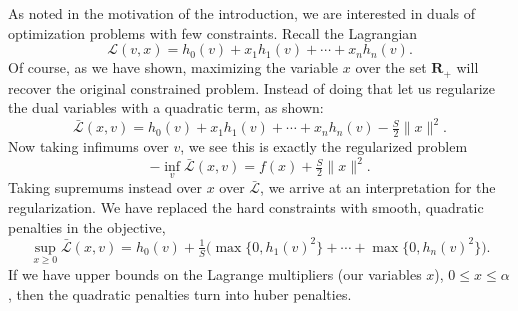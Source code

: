 \begin{example} As noted in the motivation of the introduction, we are interested
in duals of optimization problems with few constraints. Recall the Lagrangian
\[
\mathcal{L}(v,x) = h_0(v) + x_1h_1(v) + \cdots + x_nh_n(v).
\]
Of course, as we have shown, maximizing the variable $x$ over the set $\mathbf{R}_{+}$ will recover
the original constrained problem. Instead of doing that let us regularize
the dual variables with a quadratic term, as shown:
\[
\bar{\mathcal{L}}(x,v)=h_0(v)+x_1h_1(v) + \cdots + x_nh_n(v) - \tfrac{S}{2}\|x\|^2.
\]
Now taking infimums over $v$, we see this is exactly the regularized problem
\[
-\inf_v\bar{\mathcal{L}}(x,v) = f(x) + \tfrac{S}{2}\|x\|^2.
\]
Taking supremums instead over $x$ over $\mathcal{\bar{L}}$, we arrive at an
interpretation for the regularization. We have replaced the hard constraints
with smooth,  quadratic penalties in the objective,
\[
\sup_{x\geq0}\bar{\mathcal{L}}(x,v)=h_0(v)+ \tfrac{1}{S}\big(\max\{0,h_1 (v)^2\} + \cdots + \max\{0,h_n (v)^2\}\big).
\]
If we have upper bounds on the Lagrange multipliers (our variables $x$),
$0\leq x\leq\alpha$, then the quadratic penalties turn into huber penalties. 

\end{example}

